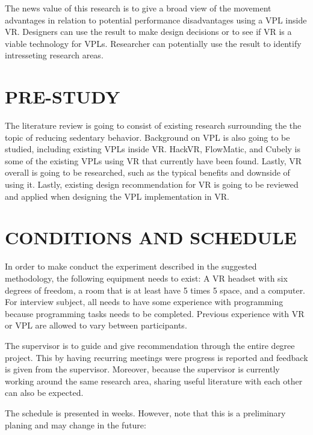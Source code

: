 \documentclass{sigchi}
\begin{document}
The news value of this research is to give a broad view of the movement advantages in relation to potential performance disadvantages using a VPL inside VR. Designers can use the result to make design decisions or to see if VR is a viable technology for VPLs. Researcher can potentially use the result to identify intresseting research areas.

\section{PRE-STUDY}
The literature review is going to consist of existing research surrounding the the topic of reducing sedentary behavior. Background on VPL is also going to be studied, including existing VPLs inside VR. HackVR, FlowMatic, and Cubely is some of the existing VPLs using VR that currently have been found. Lastly, VR overall is going to be researched, such as the typical benefits and downside of using it. Lastly, existing design recommendation for VR is going to be reviewed and applied when designing the VPL implementation in VR.  

\section{CONDITIONS AND SCHEDULE}
In order to make conduct the experiment described in the suggested methodology, the following equipment needs to exist: A VR headset with six degrees of freedom, a room that is at least have 5 times 5 space, and a computer. For interview subject, all needs to have some experience with programming because programming tasks needs to be completed. Previous experience with VR or VPL are allowed to vary between participants.

The supervisor is to guide and give recommendation through the entire degree project. This by having recurring meetings were progress is reported and feedback is given from the supervisor. Moreover, because the supervisor is currently working around the same research area, sharing useful literature with each other can also be expected.

The schedule is presented in weeks. However, note that this is a preliminary planing and may change in the future:
\end{document}
